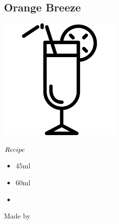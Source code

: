 \subsection{Orange Breeze}
\vspace{-7.6mm}
\hspace{43mm}
\includegraphics[scale=.07]{cocktail_glass_tall.png}
\vspace{2.5mm}
\begin{itembox}[l]{\boldmath $Recipe$}
\begin{itemize}
\setlength{\parskip}{0cm}
\setlength{\itemsep}{0cm}
\item \sake 45ml
\item \oj 60ml
\item \tw
\end{itemize}
\vspace{-4mm}
Made by \build
\end{itembox}
